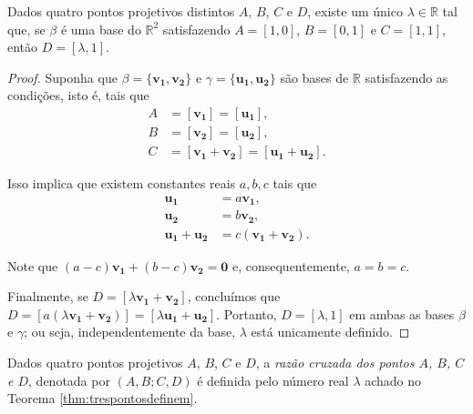 \begin{thm}\label{thm:trespontosdefinem}
  Dados quatro pontos projetivos distintos \(A\), \(B\), \(C\) e \(D\), existe um único \(\lambda \in \mathbb{R}\) tal que, se \(\beta\) é uma base do \(\mathbb{R}^2\) satisfazendo \(A = [1, 0]\), \(B = [0, 1]\) e \(C = [1, 1]\), então \(D = [\lambda, 1]\).
\end{thm}
\begin{proof}
  Suponha que \(\beta = \{\mathbf{v_1}, \mathbf{v_2}\}\) e \(\gamma = \{\mathbf{u_1}, \mathbf{u_2}\}\) são bases de \(\mathbb{R}\) satisfazendo as condições, isto é, tais que
  \begin{align*}
    A &= [\mathbf{v_1}] = [\mathbf{u_1}], \\
    B &= [\mathbf{v_2}] = [\mathbf{u_2}], \\
    C &= [\mathbf{v_1} + \mathbf{v_2}] = [\mathbf{u_1} + \mathbf{u_2}].
  \end{align*}

  Isso implica que existem constantes reais \(a, b, c\) tais que
  \begin{align*}
    \mathbf{u_1} &= a \mathbf{v_1}, \\
    \mathbf{u_2} &= b \mathbf{v_2}, \\
    \mathbf{u_1} + \mathbf{u_2} &= c \left(\mathbf{v_1} + \mathbf{v_2}\right).
  \end{align*}

  Note que \((a - c)\mathbf{v_1} + (b - c)\mathbf{v_2} = \mathbf{0}\) e, consequentemente, \(a = b = c\).

  Finalmente, se \(D = [\lambda\mathbf{v_1} + \mathbf{v_2}]\), concluímos que \(D = [a\left(\lambda\mathbf{v_1} + \mathbf{v_2}\right)] = [\lambda\mathbf{u_1} + \mathbf{u_2}]\). Portanto, \(D = [\lambda, 1]\) em ambas as bases \(\beta\) e \(\gamma\); ou seja, independentemente da base, \(\lambda\) está unicamente definido.
\end{proof}

\begin{defn}\label{defn:razaocruzada}
  Dados quatro pontos projetivos \(A\), \(B\), \(C\) e \(D\), a \emph{razão cruzada dos pontos \(A\), \(B\), \(C\) e \(D\)}, denotada por \((A, B; C, D)\) é definida pelo número real \(\lambda\) achado no Teorema \ref{thm:trespontosdefinem}.
\end{defn}
